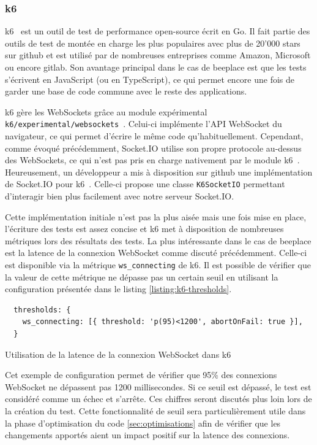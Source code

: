 \subsubsection{k6}

k6~\cite{k6} est un outil de test de performance open-source écrit en Go. Il fait partie des outils de test de montée en charge les plus populaires avec plus de 20'000 stars sur \gls{github} et est utilisé par de nombreuses entreprises comme Amazon, Microsoft ou encore \gls{gitlab}. Son avantage principal dans le cas de \gls{beeplace} est que les tests s'écrivent en JavaScript (ou en TypeScript), ce qui permet encore une fois de garder une base de code commune avec le reste des applications.

k6 gère les WebSockets grâce au module expérimental \texttt{k6/experimental/websockets}~\cite{k6-websockets}. Celui-ci implémente l'API WebSocket du navigateur, ce qui permet d'écrire le même code qu'habituellement. Cependant, comme évoqué précédemment, Socket.IO utilise son propre protocole au-dessus des WebSockets, ce qui n'est pas pris en charge nativement par le module k6~\cite{k6-socket-io-issue}. Heureusement, un développeur a mis à disposition sur \gls{github} une implémentation de Socket.IO pour k6~\cite{k6-socket-io}. Celle-ci propose une classe \texttt{K6SocketIO} permettant d'interagir bien plus facilement avec notre serveur Socket.IO.

Cette implémentation initiale n'est pas la plus aisée mais une fois mise en place, l'écriture des tests est assez concise et k6 met à disposition de nombreuses métriques lors des résultats des tests. La plus intéressante dans le cas de \gls{beeplace} est la latence de la connexion WebSocket comme discuté précédemment. Celle-ci est disponible via la métrique \texttt{ws\_connecting} de k6. Il est possible de vérifier que la valeur de cette métrique ne dépasse pas un certain seuil en utilisant la configuration présentée dans le listing \ref{listing:k6-thresholds}.

\begin{listing}[H]
  \begin{verbatim}
  thresholds: {
    ws_connecting: [{ threshold: 'p(95)<1200', abortOnFail: true }],
  }
\end{verbatim}
  \caption{Utilisation de la latence de la connexion WebSocket dans k6}
  \label{listing:k6-thresholds}
\end{listing}

Cet exemple de configuration permet de vérifier que 95\% des connexions WebSocket ne dépassent pas 1200 millisecondes. Si ce seuil est dépassé, le test est considéré comme un échec et s'arrête. Ces chiffres seront discutés plus loin lors de la création du test. Cette fonctionnalité de seuil sera particulièrement utile dans la phase d'optimisation du code \ref{sec:optimisations} afin de vérifier que les changements apportés aient un impact positif sur la latence des connexions.

